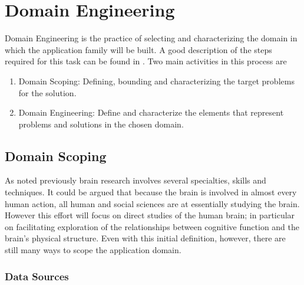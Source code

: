 \section{Domain Engineering}

Domain Engineering is the practice of selecting and characterizing the domain in which the application family will be built. A good description of the steps required for this task can be found in \autocite{czarnecki_generative_2000}. Two main activities in this process are 

\begin{enumerate}
	\item Domain Scoping: Defining, bounding and characterizing the target problems for the solution.
	\item Domain Engineering: Define and characterize the elements that represent problems and solutions in the chosen domain.
\end{enumerate}

\subsection{Domain Scoping}

As noted previously brain research involves several specialties, skills and techniques. It could be argued that because the brain is involved in almost every human action, all human and social sciences are at essentially studying the brain. However this effort will focus on direct studies of the human brain; in particular on facilitating exploration of the relationships between cognitive function and the brain's physical structure. Even with this initial definition, however, there are still many ways to scope the application domain.

\subsubsection{Data Sources}

